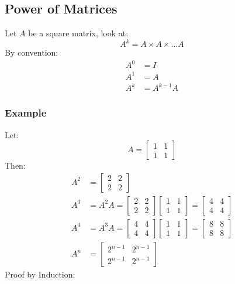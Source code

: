 \documentclass{math}
\begin{document}
\subsection*{Power of Matrices}
Let \( A \) be a square matrix, look at:
\[ A^k = A\times A\times\dots A \]
By convention:
\begin{align*}
  A^0 &= I \\
  A^1 &= A \\
  A^k &= A^{k-1}A
\end{align*}

\subsubsection*{Example}
Let:
\[ A = \begin{bmatrix}1 & 1 \\ 1 & 1\end{bmatrix} \]
Then:
\begin{align*}
  A^2 &= \begin{bmatrix}2 & 2 \\ 2 & 2\end{bmatrix} \\
  A^3 &= A^2A = \begin{bmatrix}2 & 2 \\ 2 & 2\end{bmatrix}
    \begin{bmatrix}1 & 1 \\ 1 & 1\end{bmatrix} =
    \begin{bmatrix}4 & 4 \\ 4 & 4\end{bmatrix} \\
  A^4 &= A^3A = \begin{bmatrix}4 & 4 \\ 4 & 4\end{bmatrix}
    \begin{bmatrix}1 & 1 \\ 1 & 1\end{bmatrix} =
    \begin{bmatrix}8 & 8 \\ 8 & 8\end{bmatrix} \\
  A^n &= \begin{bmatrix} 2^{n-1} & 2^{n-1} \\ 2^{n-1} & 2^{n-1}\end{bmatrix}
\end{align*}
Proof by Induction:
\end{document}
